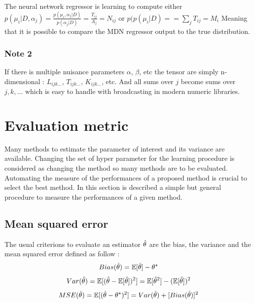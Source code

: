 The neural network regressor is learning to compute either $p(\mu_i |D, \alpha_j) = \frac{p(\mu_i, \alpha_j | D)}{p(\alpha_j | D)} = \frac{T_{ij}}{A_j} = N_{ij}$ or $p(p(\mu_i |D) = = \sum_j T_{ij} = M_i$
Meaning that it is possible to compare the MDN regressor output to the true distribution.


\subsubsection{Note 2}

If there is multiple nuisance parameters $\alpha$, $\beta$, etc the tensor are simply n-dimensional : $L_{ijk...}$, $T_{ijk...}$, $K_{ijk...}$, etc.
And all sums over $j$ become sums over $j,k, ...$ which is easy to handle with broadcasting in modern numeric libraries.










\section{Evaluation metric} %
\label{sec:evaluation_metric}


Many methods to estimate the parameter of interest and its variance are available.
Changing the set of hyper parameter for the learning procedure is considered as changing the method so many methods are to be evaluated.
Automating the measure of the performances of a proposed method is crucial to select the best method.
In this section is described a simple but general procedure to measure the performances of a given method.


\subsection{Mean squared error} %
\label{sub:mean_squared_error}


The usual criterions to evaluate an estimator $\hat\theta$ are the bias, the variance and the mean squared error defined as follow :
\begin{equation}
  Bias(\hat\theta) = \mathbb{E}[\hat\theta] - \theta^\star
\end{equation}
\begin{equation}
  Var(\hat\theta) = \mathbb{E}[ (\hat\theta - \mathbb{E}[\hat\theta])^2 ] = \mathbb{E}[\hat\theta^2] - (\mathbb{E}[\hat\theta])^2
\end{equation}
\begin{equation}
  MSE(\hat\theta) = \mathbb{E}[(\hat\theta - \theta^\star)^2] = Var(\hat\theta) + [Bias(\hat\theta)]^2
\end{equation}

